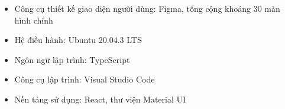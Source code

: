 \documentclass[./../main.tex]{subfiles}
\begin{document}
\begin{itemize}
    \item
    Công cụ thiết kế giao diện người dùng: Figma, tổng cộng khoảng 30 màn hình chính
    \item
    Hệ điều hành: Ubuntu 20.04.3 LTS
    \item
    Ngôn ngữ lập trình: TypeScript 
    \item
    Công cụ lập trình: Visual Studio Code
    \item
    Nền tảng sử dụng: React, thư viện Material UI
    
      
    \end{itemize}
\end{document}
